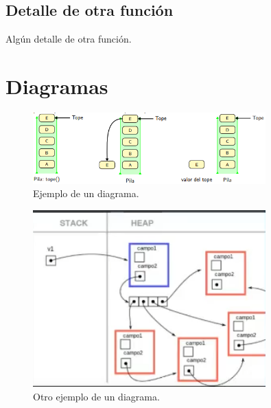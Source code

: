 \documentclass[titlepage,a4paper]{article}
\begin{document}
\subsection{Detalle de otra función}
Algún detalle de otra función.

\section{Diagramas}\label{sec:diagramas}

\begin{figure}[H]
\centering
\includegraphics[width=0.8\textwidth]{diagrama1.png}
\caption{\label{fig:seq01}Ejemplo de un diagrama.}
\end{figure}


\begin{figure}[H]
\centering
\includegraphics[width=0.8\textwidth]{diagrama2.png}
\caption{\label{fig:seq02}Otro ejemplo de un diagrama.}
\end{figure}
\end{document}
